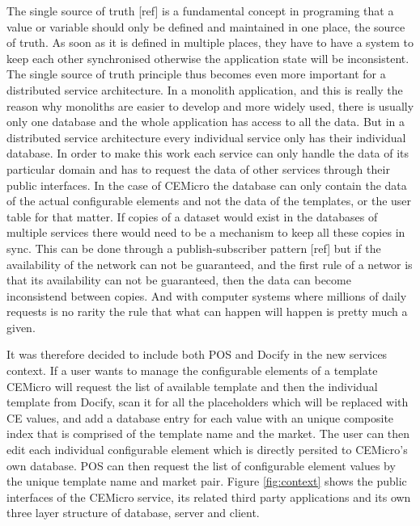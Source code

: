 The single source of truth [ref] is a fundamental concept in programing that a value or variable should only be defined and maintained in one place, the source of truth. As soon as it is defined in multiple places, they have to have a system to keep each other synchronised otherwise the application state will be inconsistent. The single source of truth principle thus becomes even more important for a distributed service architecture. In a monolith application, and this is really the reason why monoliths are easier to develop and more widely used, there is usually only one database and the whole application has access to all the data. But in a distributed service architecture every individual service only has their individual database. In order to make this work each service can only handle the data of its particular domain and has to request the data of other services through their public interfaces. In the case of CEMicro the database can only contain the data of the actual configurable elements and not the data of the templates, or the user table for that matter. If copies of a dataset would exist in the databases of multiple services there would need to be a mechanism to keep all these copies in sync. This can be done through a publish-subscriber pattern [ref] but if the availability of the network can not be guaranteed, and the first rule of a networ is that its availability can not be guaranteed, then the data can become inconsistend between copies. And with computer systems where millions of daily requests is no rarity the rule that what can happen will happen is pretty much a given.

It was therefore decided to include both POS and Docify in the new services context. If a user wants to manage the configurable elements of a template CEMicro will request the list of available template and then the individual template from Docify, scan it for all the placeholders which will be replaced with CE values, and add a database entry for each value with an unique composite index that is comprised of the template name and the market. The user can then edit each individual configurable element which is directly persited to CEMicro's own database. POS can then request the list of configurable element values by the unique template name and market pair. Figure \ref{fig:context} shows the public interfaces of the CEMicro service, its related third party applications and its own three layer structure of database, server and client.

